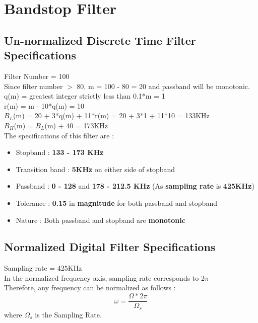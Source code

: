 \documentclass{article}
\begin{document}
\newpage
\section{\textbf{Bandstop Filter}}
\subsection{\textbf{Un-normalized Discrete Time Filter Specifications}}
Filter Number = 100\\
Since filter number $>$ 80, m = 100 - 80 = 20 and passband will be monotonic.\\
q(m) = greatest integer strictly less than 0.1*m = 1\\
r(m) = m - 10*q(m) = 10\\
$B_L$(m) = 20 + 3*q(m) + 11*r(m) = 20 + 3*1 + 11*10 = 133KHz \\
$B_H$(m) = $B_L$(m) + 40 = 173KHz\\

\vspace{1.5em}
\noindent
The specifications of this filter are :
\begin{itemize}
    \item Stopband : \textbf{133 - 173 KHz}
    \item  Transition band : \textbf{5KHz} on either side of stopband
    \item Passband : \textbf{0 - 128} and \textbf{178 - 212.5 KHz} (As \textbf{sampling rate} is \textbf{425KHz})

    \item  Tolerance : \textbf{0.15} in \textbf{magnitude} for both passband and stopband
    \item  Nature : Both passband and stopband are \textbf{monotonic}
\end{itemize}

\subsection{Normalized Digital Filter Specifications}
Sampling rate = 425KHz\\
In the normalized frequency axis, sampling rate corresponds to 2$\pi$\\
Therefore, any frequency can be normalized as follows :
\begin{equation*}
    \omega = \frac{\Omega*2\pi}{\Omega_s}
\end{equation*}
where $\Omega_s$ is the Sampling Rate.\\
\end{document}
